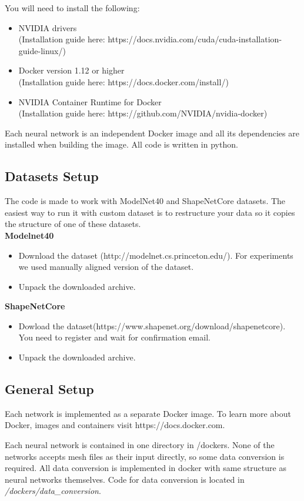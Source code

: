 You will need to install the following:
\begin{itemize}
	\item NVIDIA drivers \\(Installation guide here: https://docs.nvidia.com/cuda/cuda-installation-guide-linux/)
	\item Docker version 1.12 or higher \\(Installation guide here: https://docs.docker.com/install/)
	\item NVIDIA Container Runtime for Docker \\(Installation guide here: https://github.com/NVIDIA/nvidia-docker)
\end{itemize}
Each neural network is an independent Docker image and all its dependencies are installed when building the image. All code is written in python.  

\subsection{Datasets Setup}
The code is made to work with ModelNet40 and ShapeNetCore datasets. The easiest way to run it with custom dataset is to restructure your data so it copies the structure of one of these datasets.\\
\textbf{Modelnet40}
\begin{itemize}
	\item {Download the dataset (http://modelnet.cs.princeton.edu/). For experiments we used manually aligned version of the dataset.}
	\item{Unpack the downloaded archive.}
\end{itemize}
\textbf{ShapeNetCore}
\begin{itemize}
		\item {Dowload the dataset(https://www.shapenet.org/download/shapenetcore). You need to register and wait for confirmation email.}
	\item{Unpack the downloaded archive.}
\end{itemize}

\subsection{General Setup}
Each network is implemented as a separate Docker image. To learn more about Docker, images and containers visit https://docs.docker.com.

Each neural network is contained in one directory in /dockers. None of the networks accepts mesh files as their input directly, so some data conversion is required. All data conversion is implemented in docker with same structure as neural networks themselves. Code for data conversion is located in \textit{/dockers/data\_conversion}.

